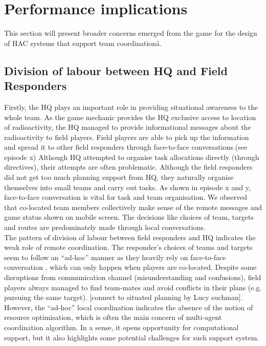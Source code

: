 \section{Performance implications}
This section will present broader concerns emerged from the game for the design of HAC systems that support team coordinationå.\\

\subsection{Division of labour between HQ and Field Responders}
Firstly, the HQ plays an important role in providing situational awareness to the whole team. As the game mechanic provides the HQ exclusive access to location of radioactivity, the HQ managed to provide informational messages about the radioactivity to field players. Field players are able to pick up the information and spread it to other field responders through face-to-face conversations.(see episode x) Although HQ attempted to organise task allocations directly (through directives), their attempts are often problematic.  Although the field responders did not get too much planning support from HQ, they naturally organise themselves into small teams and carry out tasks. As shown in episode x and y,  face-to-face conversation is vital for task and team organisation. We observed that co-located team members collectively make sense of the remote messages and game status shown on mobile screen. The decisions like choices of team, targets and routes are  predominately made through local conversations.\\

The pattern of division of labour between field responders and HQ indicates the weak role of remote coordination. The responder's choices of teams and targets seem to follow an ``ad-hoc'' manner as they heavily rely on face-to-face conversation , which can only happen when players are co-located. Despite some disruptions from communication channel (misunderstanding and confusions), field players always managed to find team-mates and avoid conflicts in their plans (e.g. pursuing the same target). [connect to situated planning by Lucy suchman]. However, the ``ad-hoc'' local coordination indicates the absence of the notion of resource optimisation, which is often the main concern of multi-agent coordination algorithm. In a sense, it opens opportunity for computational support, but it also highlights some potential challenges for such support system. \\

